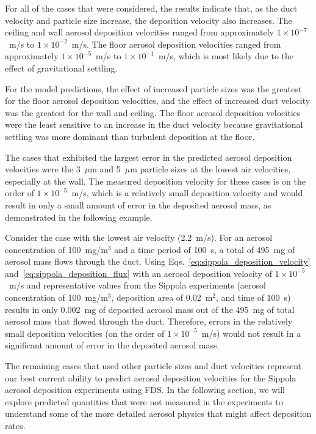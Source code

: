 For all of the cases that were considered, the results indicate that, as the duct velocity and particle size increase, the deposition velocity also increases. The ceiling and wall aerosol deposition velocities ranged from approximately $1 \times 10^{-7}$~m/s to $1 \times 10^{-2}$~m/s. The floor aerosol deposition velocities ranged from approximately $1 \times 10^{-5}$~m/s to $1 \times 10^{-1}$~m/s, which is most likely due to the effect of gravitational settling.

For the model predictions, the effect of increased particle sizes was the greatest for the floor aerosol deposition velocities, and the effect of increased duct velocity was the greatest for the wall and ceiling. The floor aerosol deposition velocities were the least sensitive to an increase in the duct velocity because gravitational settling was more dominant than turbulent deposition at the floor.

The cases that exhibited the largest error in the predicted aerosol deposition velocities were the 3~$\mu$m and 5~$\mu$m particle sizes at the lowest air velocities, especially at the wall. The measured deposition velocity for these cases is on the order of $1 \times 10^{-5}$~m/s, which is a relatively small deposition velocity and would result in only a small amount of error in the deposited aerosol mass, as demonstrated in the following example.

Consider the case with the lowest air velocity (2.2~m/s). For an aerosol concentration of 100~mg/m$^3$ and a time period of 100~s, a total of 495~mg of aerosol mass flows through the duct. Using Eqs.~\ref{eq:sippola_deposition_velocity} and~\ref{eq:sippola_deposition_flux} with an aerosol deposition velocity of $1 \times 10^{-5}$~m/s and representative values from the Sippola experiments (aerosol concentration of 100~mg/m$^3$, deposition area of 0.02~m$^2$, and time of 100~s) results in only 0.002~mg of deposited aerosol mass out of the 495~mg of total aerosol mass that flowed through the duct. Therefore, errors in the relatively small deposition velocities (on the order of $1 \times 10^{-5}$~m/s) would not result in a significant amount of error in the deposited aerosol mass.

The remaining cases that used other particle sizes and duct velocities represent our best current ability to predict aerosol deposition velocities for the Sippola aerosol deposition experiments using FDS. In the following section, we will explore predicted quantities that were not measured in the experiments to understand some of the more detailed aerosol physics that might affect deposition rates.

